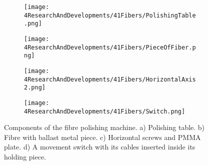 \begin{enumerate}
\begin{figure}
\centering
    \begin{subfigure}[b]{0.55\textwidth}
    \centering
    \texttt{[image: 4ResearchAndDevelopments/41Fibers/PolishingTable.png]}  
    \caption{\label{subfig:PolishingTable}}
    \end{subfigure}
    \hfill
    \begin{subfigure}[b]{0.3\textwidth}
    \centering
    \texttt{[image: 4ResearchAndDevelopments/41Fibers/PieceOfFiber.png]}  
    \caption{\label{subfig:FiberMetailcPiece}}
    \end{subfigure}
    \hfill
    \begin{subfigure}[b]{0.55\textwidth}
    \centering
    \texttt{[image: 4ResearchAndDevelopments/41Fibers/HorizontalAxis2.png]}  
    \caption{\label{subfig:HorizontalAxis}}
    \end{subfigure}
    \hfill
    \begin{subfigure}[b]{0.4\textwidth}
    \centering
    \texttt{[image: 4ResearchAndDevelopments/41Fibers/Switch.png]}  
    \caption{\label{subfig:3DSwitchPiece}}
    \end{subfigure}
 \caption{Components of the fibre polishing machine. a) Polishing table. b) Fibre with ballast metal piece. c) Horizontal screws and PMMA plate. d) A movement switch with its cables inserted inside its holding piece.}
 \label{fig:PolishingTable}
\end{figure}


\end{enumerate}
